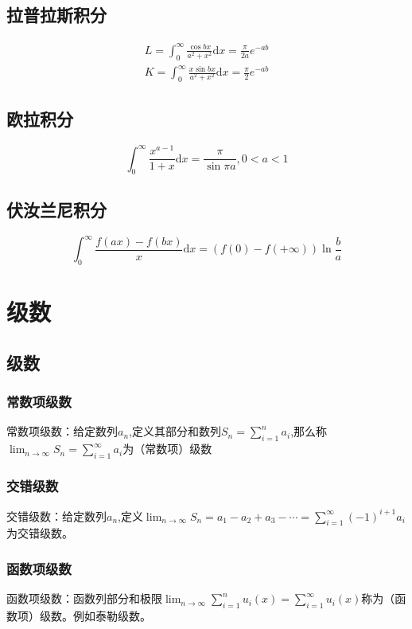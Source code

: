 \documentclass[12pt,a4paper,UTF8]{ctexbook}
\theoremstyle{plain}
\begin{document}
\section{拉普拉斯积分}
\begin{equation}
    \begin{split}
        L=\int_0^\infty \frac{\cos bx}{a^2+x^2}\mathrm d x=\frac{\pi}{2a}e^{-ab}\\
        K=\int_0^\infty\frac{x\sin bx}{a^2+x^2}\mathrm d x=\frac{\pi}{2}e^{-ab}
    \end{split}
\end{equation}
\section{欧拉积分}
\begin{equation}
    \int_0^\infty \frac{x^{a-1}}{1+x}\mathrm d x=\frac{\pi}{\sin \pi a},0<a<1
\end{equation}
\section{伏汝兰尼积分}
\begin{equation}
    \int_0^\infty\frac{f(ax)-f(bx)}{x}\mathrm d x=(f(0)-f(+\infty))\ln\frac{b}{a}
\end{equation}

\chapter{级数}
\section{级数}
\subsection{常数项级数}
常数项级数：给定数列$a_n$,定义其部分和数列$S_n=\sum_{i=1}^na_i$,那么称$\lim_{n\to \infty}S_n=\sum_{i=1}^\infty a_i$为（常数项）级数
\subsection{交错级数}
交错级数：给定数列$a_n$,定义$\lim_{n\to\infty}S_n=a_1-a_2+a_3-\cdots=\sum_{i=1}^\infty (-1)^{i+1}a_i$为交错级数。
\subsection{函数项级数}
函数项级数：函数列部分和极限$\lim_{n\to\infty}\sum_{i=1}^nu_i(x)=\sum_{i=1}^\infty u_i(x)$称为（函数项）级数。例如泰勒级数。
\end{document}
